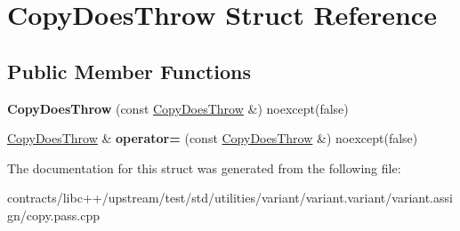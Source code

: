 \hypertarget{struct_copy_does_throw}{}\section{Copy\+Does\+Throw Struct Reference}
\label{struct_copy_does_throw}
\subsection*{Public Member Functions}
\begin{DoxyCompactItemize}
\item 
\mbox{\label{struct_copy_does_throw_a4e08c05ac87cd9d3eb697e3f1316cd03}} 
{\bfseries Copy\+Does\+Throw} (const \mbox{\hyperlink{struct_copy_does_throw}{Copy\+Does\+Throw}} \&) noexcept(false)
\item 
\mbox{\label{struct_copy_does_throw_a85e3a1d934cea02b922eadbb179e70b2}} 
\mbox{\hyperlink{struct_copy_does_throw}{Copy\+Does\+Throw}} \& {\bfseries operator=} (const \mbox{\hyperlink{struct_copy_does_throw}{Copy\+Does\+Throw}} \&) noexcept(false)
\end{DoxyCompactItemize}


The documentation for this struct was generated from the following file\+:\begin{DoxyCompactItemize}
\item 
contracts/libc++/upstream/test/std/utilities/variant/variant.\+variant/variant.\+assign/copy.\+pass.\+cpp\end{DoxyCompactItemize}
